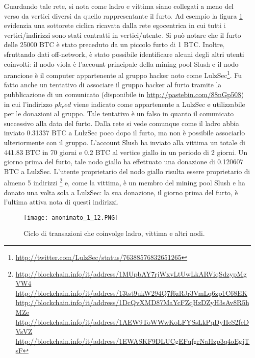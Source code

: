 Guardando tale rete, si nota come ladro e vittima siano collegati a meno del verso da vertici diversi da quello rappresentante il furto. Ad esempio la figura \ref{anonimato_1_12} evidenzia una sottorete ciclica ricavata dalla rete egocentrica in cui tutti i vertici/indirizzi sono stati contratti in vertici/utente.
Si può notare che il furto delle 25000 BTC è stato preceduto da un piccolo furto di 1 BTC. Inoltre, sfruttando dati off-network, è stato possibile identificare alcuni degli altri utenti coinvolti: il nodo viola è l'account principale della mining pool Slush e il nodo arancione è il computer appartenente al gruppo hacker noto come LulzSec\footnote{\url{http://twitter.com/LulzSec/status/76388576832651265}}. Fu fatto anche un tentativo di associare il gruppo hacker al furto tramite la pubblicazione di un comunicato (disponibile in \url{http://pastebin.com/88nGp508}) in cui l'indirizzo $pk_red$ viene indicato come appartenente a LulzSec e utilizzabile per le donazioni al gruppo. Tale tentativo è un falso in quanto il comunicato successivo alla data del furto.
Dalla rete si vede comunque come il ladro abbia inviato 0.31337 BTC a LulzSec poco dopo il furto, ma non è possibile associarlo ulteriormente con il gruppo.
L'account Slush ha inviato alla vittima un totale di 441.83 BTC in 70 giorni e 0.2 BTC al vertice giallo in un periodo di 2 giorni. Un giorno prima del furto, tale nodo giallo ha effettuato una donazione di 0.120607 BTC a LulzSec. L'utente proprietario del nodo giallo risulta essere proprietario di almeno 5 indirizzi \footnote{\url{http://blockchain.info/it/address/1MUpbAY7rjWxvLtUwLkARViqSdzypMgVW4}\\ \url{http://blockchain.info/it/address/13tst9ukW294Q7f6zRJr3VmLq6zp1C68EK}\\ \url{http://blockchain.info/it/address/1DcQvXMD87MaYcFZqHzDZyH3sAv8R5hMZe}\\ \url{http://blockchain.info/it/address/1AEW9ToWWwKoLFYSsLkPqDyHeS2feDVsVZ}\\ \url{http://blockchain.info/it/address/1EWASKF9DLUCgEFqfgrNaHzp3q4oEgjTsF}} e, come la vittima, è un membro del mining pool Slush e ha donato una volta sola a LulzSec: la sua donazione, il giorno prima del furto, è l'ultima attiva nota di questi indirizzi.

\begin{figure}[htbp]
\centering
\texttt{[image: anonimato\_1\_12.PNG]}
\caption{Ciclo di transazioni che coinvolge ladro, vittima e altri nodi.\label{anonimato_1_12}}
\end{figure}

